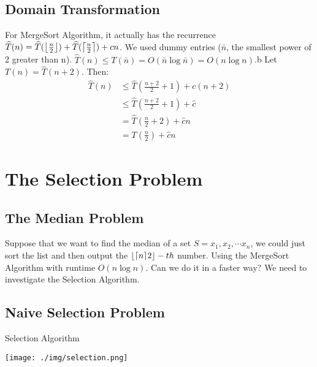 \documentclass[11pt, a4paper, oneside]{book}
\DeclarePairedDelimiter\ceil{\lceil}{\rceil}
\DeclarePairedDelimiter\floor{\lfloor}{\rfloor}
\theoremstyle{theoremdd}
\theoremstyle{remark}
\begin{document}
\subsection{Domain Transformation}
For MergeSort Algorithm, it actually has the recurrence $\widehat T(n) = \widehat T(\floor*{\frac{n}{2}}) + \widehat T(\ceil*{\frac{n}{2}})+cn$. We used dummy entries ($\bar n$, the smallest power of 2 greater than n). $\widehat T(n) \leq T(\bar n) = O(\bar n\log \bar n) = O(n\log n)$.b
Let $T(n) = \widehat T(n+2)$. Then: 
\begin{align*}
	\widehat T(n) & \leq \widehat T(\frac{n+2}{2}+1) + c(n+2) \\&
	                \leq \widehat T(\frac{n+2}{2}+1) + \widehat c \\&
	                = \widehat T(\frac{n}{2}+2) + \widehat cn \\&
	                = T(\frac{n}{2}) + \widehat cn
\end{align*}

\section{The Selection Problem}
\subsection{The Median Problem}
Suppose that we want to find the median of a set $S = {x_{1}, x_{2},\cdots x_{n}}$, we could just sort the list and then output the $\floor*{\ceil*{n}{2}}-th$ number. Using the MergeSort Algorithm with runtime $O(n\log n)$. Can we do it in a faster way? We need to investigate the Selection Algorithm. 

\subsection{Naive Selection Problem}
\begin{algorithm}[H]
\SetAlgoLined
{}
\caption{Selection Algorithm}
\end{algorithm}

\begin{center}
\texttt{[image: ./img/selection.png]}
\end{center}
\end{document}
